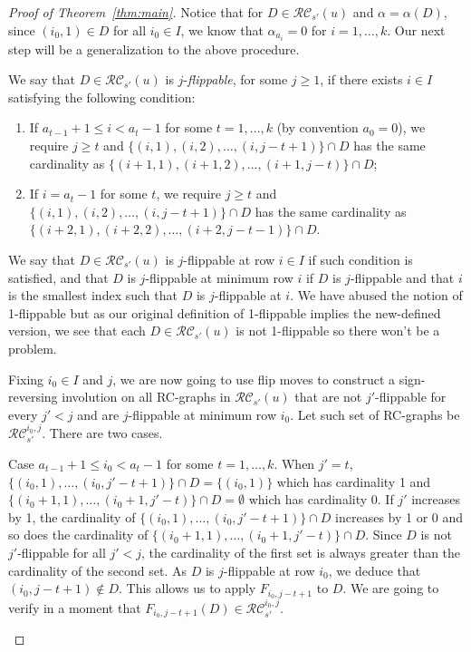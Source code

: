 \documentclass[ALCO,ThmDefs,Unicode,epreuves]{cedram}
\newcommand{\RC}{\mathcal{RC}}
\begin{document}
\begin{proof}[Proof of Theorem~\ref{thm:main}]
Notice that for $D\in\RC_{s'}(u)$ and $\alpha=\alpha(D)$, since $(i_0,1)\in D$ for all $i_0\in I$, we know that $\alpha_{a_i}=0$ for $i=1,\ldots,k$. Our next step will be a generalization to the above procedure.

We say that $D\in\RC_{s'}(u)$ is $j$-\emph{flippable}, for some $j\geq1$, if there exists $i\in I$ satisfying the following condition:
\begin{enumerate}
\item\label{proof_theo2.2_deux1} If $a_{t-1}+1\leq i<a_t-1$ for some $t=1,\ldots,k$ (by convention $a_{0}=0$), we require $j\geq t$ and $\{(i,1),(i,2),\ldots,(i,j-t+1)\}\cap D$ has the same cardinality as $\{(i+1,1),(i+1,2),\ldots,(i+1,j-t)\}\cap D$;
\item\label{proof_theo2.2_deux2} If $i=a_t-1$ for some $t$, we require $j\geq t$ and $\{(i,1),(i,2),\ldots,(i,j-t+1)\}\cap D$ has the same cardinality as $\{(i+2,1),(i+2,2),\ldots,(i+2,j-t-1)\}\cap D$.
\end{enumerate}
We say that $D\in\RC_{s'}(u)$ is $j$-flippable at row $i\in I$ if such condition is satisfied, and that $D$ is $j$-flippable at minimum row $i$ if $D$ is $j$-flippable and that $i$ is the smallest index such that $D$ is $j$-flippable at $i$. We have abused the notion of 1-flippable but as our original definition of 1-flippable implies the new-defined version, we see that each $D\in\RC_{s'}(u)$ is not 1-flippable so there won't be a problem.

Fixing $i_0\in I$ and $j$, we are now going to use flip moves to construct a sign-reversing involution on all RC-graphs in $\RC_{s'}(u)$ that are not $j'$-flippable for every $j'<j$ and are $j$-flippable at minimum row $i_0$. Let such set of RC-graphs be $\RC_{s'}^{i_0,j}$. There are two cases.


\let\oldthecdrthm\thecdrthm
\renewcommand{\thecdrthm}{(\arabic{cdrthm})}
\setcounter{cdrthm}{0}
\begin{enonce}[remark]{Case}\label{case1}
 $a_{t-1}+1\leq i_0<a_t-1$ for some $t=1,\ldots,k$. When $j'=t$, $\{(i_0,1),\ldots,(i_0,j'-t+1)\}\cap D=\{(i_0,1)\}$ which has cardinality 1 and $\{(i_0+1,1),\ldots,(i_0+1,j'-t)\}\cap D=\emptyset$ which has cardinality 0. If $j'$ increases by 1, the cardinality of $\{(i_0,1),\ldots,(i_0,j'-t+1)\}\cap D$ increases by 1 or 0 and so does the cardinality of $\{(i_0+1,1),\ldots,(i_0+1,j'-t)\}\cap D$. Since $D$ is not $j'$-flippable for all $j'<j$, the cardinality of the first set is always greater than the cardinality of the second set. As $D$ is $j$-flippable at row $i_0$, we deduce that $(i_0,j-t+1)\notin D$. This allows us to apply $F_{i_0,j-t+1}$ to $D$. We are going to verify in a moment that $F_{i_0,j-t+1}(D)\in\RC_{s'}^{i_0,j}$.
\end{enonce}


\end{proof}
\end{document}
